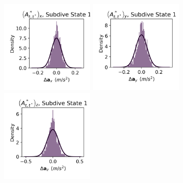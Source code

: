 \documentclass{article}
\begin{document}
        \begin{center}
        \includegraphics[width=1.75in]{../Plots/HHMM_empirical_hist_Ax_0.png}
        \includegraphics[width=1.75in]{../Plots/HHMM_empirical_hist_Ay_0.png}
        \includegraphics[width=1.75in]{../Plots/HHMM_empirical_hist_Az_0.png}
        

\end{center}
\end{document}
